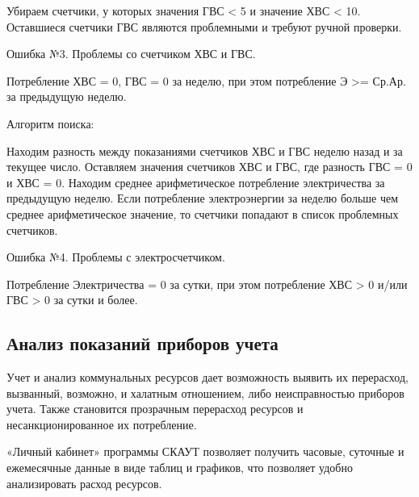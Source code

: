 Убираем счетчики, у которых значения ГВС < 5 и значение ХВС < 10.
Оставшиеся счетчики ГВС являются проблемными и требуют ручной проверки.

Ошибка №3. Проблемы со счетчиком ХВС и ГВС.

Потребление ХВС = 0, ГВС = 0 за неделю, при этом потребление Э  >= Ср.Ар. за предыдущую неделю.

Алгоритм поиска:

Находим разность между показаниями счетчиков ХВС и ГВС неделю назад и за текущее число.
Оставляем значения счетчиков ХВС и ГВС, где разность ГВС = 0 и ХВС = 0.
Находим среднее арифметическое потребление электричества за предыдущую неделю.
Если потребление электроэнергии за неделю больше чем среднее арифметическое значение, то счетчики попадают в список проблемных счетчиков.

Ошибка №4. Проблемы с электросчетчиком.

Потребление Электричества = 0 за сутки, при этом потребление ХВС > 0 и/или ГВС > 0 за сутки и более.

\subsection{Анализ показаний приборов учета}

Учет и анализ коммунальных ресурсов дает возможность выявить их перерасход, вызванный, возможно, и халатным отношением, либо неисправностью приборов учета. Также становится прозрачным перерасход ресурсов и несанкционированное их потребление.\cite{journal}

«Личный кабинет» программы СКАУТ позволяет получить часовые, суточные и ежемесячные данные в виде таблиц и графиков, что позволяет удобно анализировать расход ресурсов.

